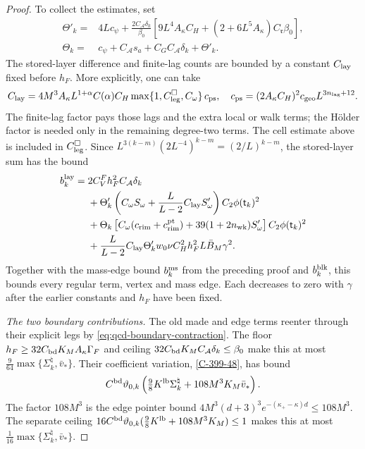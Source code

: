 \documentclass[11pt,letterpaper,reqno]{amsart}
\theoremstyle{definition}
\theoremstyle{remark}
\begin{document}
\begin{proof}
To collect the estimates, set
\[
\begin{split}
 \Theta'_k={}&4Lc_\psi+
 \frac{2C_{\mathcal A}\delta_k}{\beta_0}
 [9L^4A_\kappa C_H+(2+6L^5A_\kappa)C_{\mathfrak r}\beta_0],\\
 \Theta_k={}&c_\psi+C_{\mathcal A}s_a+
                           C_GC_{\mathcal A}\delta_k+\Theta'_k.
\end{split}
\]
The stored-layer difference and finite-lag counts
are bounded by a constant $C_{\rm lay}$ fixed
before $h_F$. More explicitly, one can take
\[
 C_{\rm lay}
 =4M^3A_\kappa L^{1+\alpha}C(\alpha)C_H
       \max\{1,C_{\rm leg}^{\square},C_\omega\}\,c_{\rm ps},
 \quad
 c_{\rm ps}=(2A_\kappa C_H)^2c_{\rm geo}
                                  L^{3n_{\rm lag}+12}.
\]
The finite-lag factor pays those lags and the
extra local or walk terms; the H\"older factor
is needed only in the remaining degree-two
terms. The cell estimate above is included
in $C_{\rm leg}^{\square}$.
Since $L^{3(k-m)}(2L^{-4})^{k-m}=(2/L)^{k-m}$,
the stored-layer sum has the bound
\[
\begin{split}
 b_k^{\rm lay}={}&2C_V^Fh_F^2C_{\mathcal A}\delta_k\\
 &+\Theta'_k
 \left(C_\omega S_\omega+\frac{L}{L-2}C_{\rm lay}S'_\omega\right)
                                  C_2\phi(\mathsf t_k)^2\\
 &+\Theta_k\left[
 C_\omega(c_{\rm rim}+c_{\rm rim}^{\rm pt})
              +39(1+2n_{\rm wk})S'_\omega\right]
                                  C_2\phi(\mathsf t_k)^2\\
 &+\frac L{L-2}C_{\rm lay}\Theta'_k
                     w_0\nu C_H^2h_F^2L\bar B_M\gamma^2 .
\end{split}
\]
Together with the mass-edge bound $b_k^{\rm ms}$
from the preceding proof and $b_k^{\rm blk}$,
this bounds every regular term, vertex and
mass edge. Each decreases to zero with
$\gamma$ after the earlier constants and
$h_F$ have been fixed.

\emph{The two boundary contributions.}
The old made and edge terms reenter through
their explicit legs by
\eqref{eq:qcd-boundary-contraction}.
The floor $h_F\ge32C_{\rm bd}K_MA_\kappa\Gamma_F$
and ceiling
$32C_{\rm bd}K_MC_{\mathcal A}\delta_k\le\beta_0$
make this at most
$\frac9{64}\max\{\Sigma_k^\natural,\bar v_*\}$.
Their coefficient variation, \cref{C-399-48},
has bound
\[
 C^{\rm bd}\vartheta_{0,k}
  \left(\tfrac98K^{\rm lb}\Sigma_k^\natural
                       +108M^3K_M\bar v_*\right).
\]
The factor $108M^3$ is the edge pointer bound
$4M^3(d+3)^3e^{-(\kappa_+-\kappa)d}\le108M^3$.
The separate ceiling
$16C^{\rm bd}\vartheta_{0,k}
(\frac98K^{\rm lb}+108M^3K_M)\le1$
makes this at most
$\frac1{16}\max\{\Sigma_k^\natural,\bar v_*\}$.


\end{proof}
\end{document}
